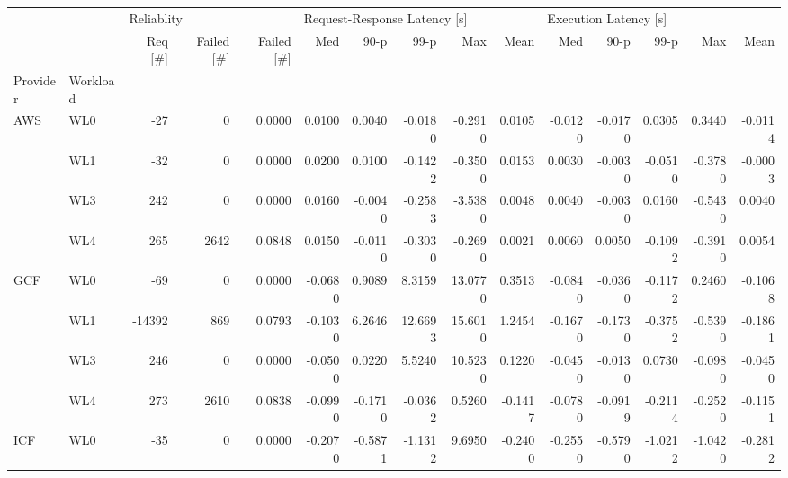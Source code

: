 \begin{tabular}{llrrrrrrrrrrrrr}
\toprule
    &     & \multicolumn{3}{l}{Reliablity} & \multicolumn{5}{l}{Request-Response Latency [s]} & \multicolumn{5}{l}{Execution Latency [s]} \\
    &     &    Req [\#] & Failed [\#] & Failed [\#] &                          Med &    90-p &    99-p &      Max &    Mean &                   Med &    90-p &    99-p &     Max &    Mean \\
Provider & Workload &            &            &            &                              &         &         &          &         &                       &         &         &         &         \\
\midrule
AWS & WL0 &        -27 &          0 &     0.0000 &                       0.0100 &  0.0040 & -0.0180 &  -0.2910 &  0.0105 &               -0.0120 & -0.0170 &  0.0305 &  0.3440 & -0.0114 \\
    & WL1 &        -32 &          0 &     0.0000 &                       0.0200 &  0.0100 & -0.1422 &  -0.3500 &  0.0153 &                0.0030 & -0.0030 & -0.0510 & -0.3780 & -0.0003 \\
    & WL3 &        242 &          0 &     0.0000 &                       0.0160 & -0.0040 & -0.2583 &  -3.5380 &  0.0048 &                0.0040 & -0.0030 &  0.0160 & -0.5430 &  0.0040 \\
    & WL4 &        265 &       2642 &     0.0848 &                       0.0150 & -0.0110 & -0.3030 &  -0.2690 &  0.0021 &                0.0060 &  0.0050 & -0.1092 & -0.3910 &  0.0054 \\
GCF & WL0 &        -69 &          0 &     0.0000 &                      -0.0680 &  0.9089 &  8.3159 &  13.0770 &  0.3513 &               -0.0840 & -0.0360 & -0.1172 &  0.2460 & -0.1068 \\
    & WL1 &     -14392 &        869 &     0.0793 &                      -0.1030 &  6.2646 & 12.6693 &  15.6010 &  1.2454 &               -0.1670 & -0.1730 & -0.3752 & -0.5390 & -0.1861 \\
    & WL3 &        246 &          0 &     0.0000 &                      -0.0500 &  0.0220 &  5.5240 &  10.5230 &  0.1220 &               -0.0450 & -0.0130 &  0.0730 & -0.0980 & -0.0450 \\
    & WL4 &        273 &       2610 &     0.0838 &                      -0.0990 & -0.1710 & -0.0362 &   0.5260 & -0.1417 &               -0.0780 & -0.0919 & -0.2114 & -0.2520 & -0.1151 \\
ICF & WL0 &        -35 &          0 &     0.0000 &                      -0.2070 & -0.5871 & -1.1312 &   9.6950 & -0.2400 &               -0.2550 & -0.5790 & -1.0212 & -1.0420 & -0.2812 \\

\end{tabular}
